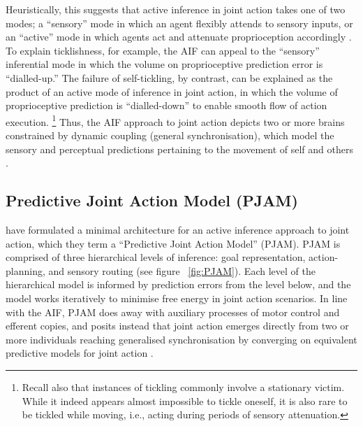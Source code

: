 Heuristically, this suggests that active inference in joint action takes one of two modes; a ``sensory'' mode in which an agent flexibly attends to sensory inputs, or an ``active'' mode in which agents act and attenuate proprioception accordingly \citep{Friston2015}. To explain ticklishness, for example, the AIF can appeal to the ``sensory'' inferential mode in which the volume on proprioceptive prediction error is ``dialled-up.''  The failure of self-tickling, by contrast, can be explained as the product of an active mode of inference in joint action, in which the volume of proprioceptive prediction is ``dialled-down'' to enable smooth flow of action execution.
  \footnote{Recall also that instances of tickling commonly involve a stationary victim. While it indeed appears almost impossible to tickle oneself, it is also rare to be tickled while moving, i.e., acting during periods of sensory attenuation.}
Thus, the AIF approach to joint action depicts two or more brains constrained by dynamic coupling (general synchronisation), which model the sensory and perceptual predictions pertaining to the movement of self and others \citep{Pesquita2017}.


\subsection{Predictive Joint Action Model (PJAM)\label{sect:PJAM}}
 \textcite{Pesquita2017} have formulated a minimal architecture for an active inference approach to joint action, which they term a ``Predictive Joint Action Model'' (PJAM).  PJAM is comprised of three hierarchical levels of inference: goal representation, action-planning, and sensory routing (see figure ~\ref{fig:PJAM}).  Each level of the hierarchical model is informed by prediction errors from the level below, and the model works iteratively to minimise free energy in joint action scenarios.  In line with the AIF, PJAM does away with auxiliary processes of motor control and efferent copies, and posits instead that joint action emerges directly from two or more individuals reaching generalised synchronisation by converging on equivalent predictive models for joint action \citep{Friston2015}.

